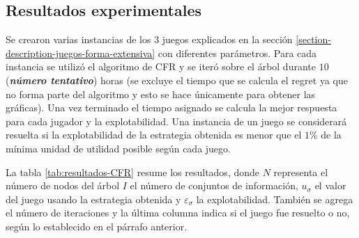 \subsection{Resultados experimentales}

Se crearon varias instancias de los $3$ juegos explicados en la sección \ref{section-description-juegos-forma-extensiva} con diferentes parámetros. Para cada instancia se utilizó el algoritmo de CFR y se iteró sobre el árbol durante $10$ (\textit{\textbf{número tentativo}}) horas (se excluye el tiempo que se calcula el regret ya que no forma parte del algoritmo y esto se hace únicamente para obtener las gráficas). Una vez terminado el tiempo asignado se calcula la mejor respuesta para cada jugador y la explotabilidad. Una instancia de un juego se considerará resuelta si la explotabilidad de la estrategia obtenida es menor que el $1\%$ de la mínima unidad de utilidad posible según cada juego.

La tabla \ref{tab:resultados-CFR} resume los resultados, donde $N$ representa el número de nodos del árbol $I$ el número de conjuntos de información, $u_{\sigma}$ el valor del juego usando la estrategia obtenida y $\varepsilon_{\sigma}$ la explotabilidad. También se agrega el número de iteraciones y la última columna indica si el juego fue resuelto o no, según lo establecido en el párrafo anterior.


